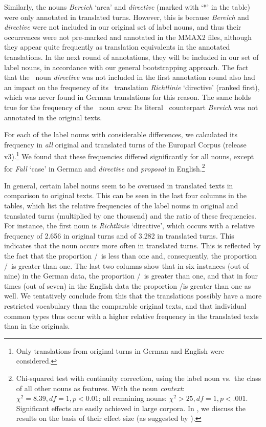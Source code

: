 \documentclass[output=paper]{LSP/langsci}
\begin{document}
Similarly, the nouns \textit{Bereich} `area' and \textit{directive} (marked with `*' in the table) were only annotated in translated turns. However, this is because \textit{Bereich} and \textit{directive} were not included in our original set of label nouns, and thus their occurrences were not pre-marked and annotated in the MMAX2 files, although they appear quite frequently as translation equivalents in the annotated translations. In the next round of annotations, they will be included in our set of label nouns, in accordance with our general bootstrapping approach. The fact that the \ENo\ noun \textit{directive} was not included in the first annotation round also had an impact on the frequency of its \DEt\ translation \textit{Richtlinie} `directive' (ranked first), which was never found in German translations for this reason. The same holds true for the frequency of the \ENt\ noun \textit{area}: Its literal \DEo\ counterpart \textit{Bereich} was not annotated in the original texts.

For each of the label nouns with considerable differences, we calculated its frequency in \emph{all} original and translated turns of the Europarl Corpus (release v3).\footnote{%
Only translations from original turns in German and English were considered.} %
We found that these frequencies differed significantly for all nouns, except for  \textit{Fall} `case' in German and \textit{directive} and \textit{proposal} in English.\footnote{%
Chi-squared test with continuity correction, using the label noun vs.\ the class of all other nouns as features. With the noun \textit{context}:  $\chi^2 = 8.39,df=1,p<0.01$; all remaining nouns: $\chi^2>25, df=1, p<.001$. Significant effects are easily achieved in large corpora. In \citet{Dipper2012}, we discuss the results on the basis of their effect size (as suggested by \citealt{Gries2005}).} %

In general, certain label nouns seem to be overused in translated texts in comparison to original texts. This can be seen in the last four columns in the tables, which list the relative frequencies of the label nouns in original and translated turns (multiplied by one thousend) and the ratio of these frequencies. For instance, the first noun is \textit{Richtlinie} `directive', which occurs with a  relative frequency of 2.656 in original turns and of 3.282 in translated turns. This indicates that the noun occurs more often in translated turns. This is reflected by the fact that the proportion \DEo/\DEt\ is less than one and, consequently, the proportion \DEt/\DEo\ is greater than one. The last two columns show that in six instances (out of nine) in the German data, the proportion  \DEt/\DEo\ is greater than one, and that in four times (out of seven) in the English data  the proportion \ENt/\ENo is greater than one as well. We tentatively conclude from this that the translations possibly have a more restricted vocabulary than the comparable original texts, and that individual common types thus occur with a higher relative frequency in the translated texts than in the originals. \label{conclusion}
\end{document}
